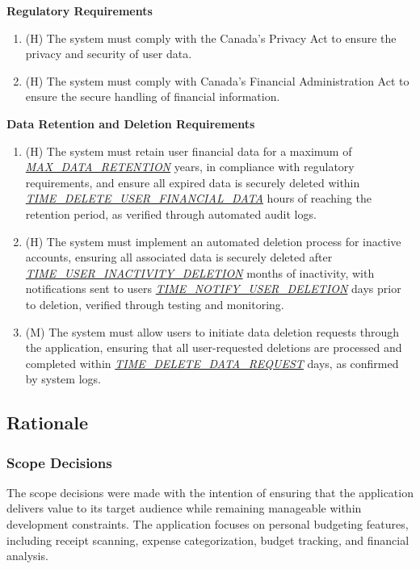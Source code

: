 \documentclass[12pt]{article}
\begin{document}
\textbf{Regulatory Requirements}
\begin{enumerate}[label=NFR-REG-\arabic*]
  \item (H) The system must comply with the Canada's Privacy Act to ensure the
  privacy and security of user data.
  \item (H) The system must comply with Canada's Financial Administration Act to
  ensure the secure handling of financial information.
\end{enumerate}

\textbf{Data Retention and Deletion Requirements}
\begin{enumerate}[label=NFR-DAT-\arabic*]
\item (H) The system must retain user financial data for a maximum of
  \hyperref[Table:AuxConstants]{\textit{MAX\_DATA\_RETENTION}} years, in
  compliance with regulatory requirements, and ensure all expired data is
  securely deleted within
  \hyperref[Table:AuxConstants]{\textit{TIME\_DELETE\_USER\_FINANCIAL\_DATA}}
  hours of reaching the retention period, as verified through automated audit
  logs.
  \item (H) The system must implement an automated deletion process for inactive
  accounts, ensuring all associated data is securely deleted after
  \hyperref[Table:AuxConstants]{\textit{TIME\_USER\_INACTIVITY\_DELETION}}
  months of inactivity, with notifications sent to users
  \hyperref[Table:AuxConstants]{\textit{TIME\_NOTIFY\_USER\_DELETION}} days
  prior to deletion, verified through testing and monitoring.
  \item (M) The system must allow users to initiate data deletion requests
  through the application, ensuring that all user-requested deletions are
  processed and completed within
  \hyperref[Table:AuxConstants]{\textit{TIME\_DELETE\_DATA\_REQUEST}} days, as
  confirmed by system logs.
\end{enumerate}



\newpage

\subsection{Rationale}

\subsubsection{Scope Decisions}
The scope decisions were made with the intention of ensuring that the
application delivers value to its target audience while remaining manageable
within development constraints. The application focuses on personal budgeting
features, including receipt scanning, expense categorization, budget tracking,
and financial analysis. \\
\end{document}
